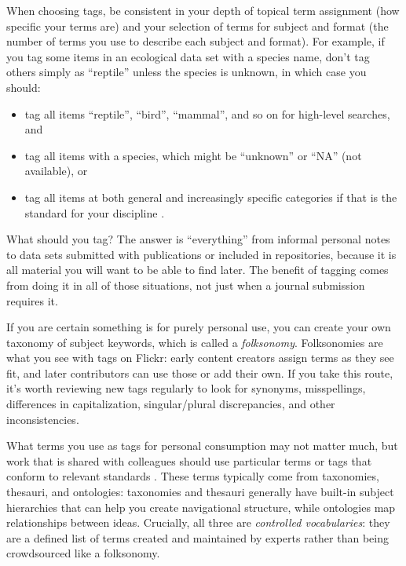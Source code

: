 \documentclass[10pt,letterpaper]{article}
\begin{document}
When choosing tags, be consistent in your depth of topical term assignment (how
specific your terms are) and your selection of terms for subject and format (the
number of terms you use to describe each subject and format). For example, if
you tag some items in an ecological data set with a species name, don't tag
others simply as ``reptile'' unless the species is unknown, in which case you
should:

\begin{itemize}

\item
  tag all items ``reptile'', ``bird'', ``mammal'', and so on for high-level
  searches, and

\item
  tag all items with a species, which might be ``unknown'' or ``NA'' (not
  available), or
  
\item
  tag all items at both general and increasingly specific categories if that is the standard for your discipline \cite{FAIR2020}.

\end{itemize}

What should you tag?  The answer is ``everything'' from informal personal notes
to data sets submitted with publications or included in repositories, because it
is all material you will want to be able to find later.  The benefit of tagging
comes from doing it in all of those situations, not just when a journal
submission requires it.

If you are certain something is for purely personal use, you can create your own
taxonomy of subject keywords, which is called a \emph{folksonomy}. Folksonomies
are what you see with tags on Flickr: early content creators assign terms as
they see fit, and later contributors can use those or add their own. If you take
this route, it's worth reviewing new tags regularly to look for synonyms,
misspellings, differences in capitalization, singular/plural discrepancies, and
other inconsistencies.

What terms you use as tags for personal consumption may not matter much, but
work that is shared with colleagues should use particular terms or tags that
conform to relevant standards \cite{FAIR2020}.  These terms typically come from
taxonomies, thesauri, and ontologies: taxonomies and thesauri generally have
built-in subject hierarchies that can help you create navigational structure,
while ontologies map relationships between ideas. Crucially, all three are
\emph{controlled vocabularies}: they are a defined list of terms created and
maintained by experts rather than being crowdsourced like a folksonomy.
\end{document}
